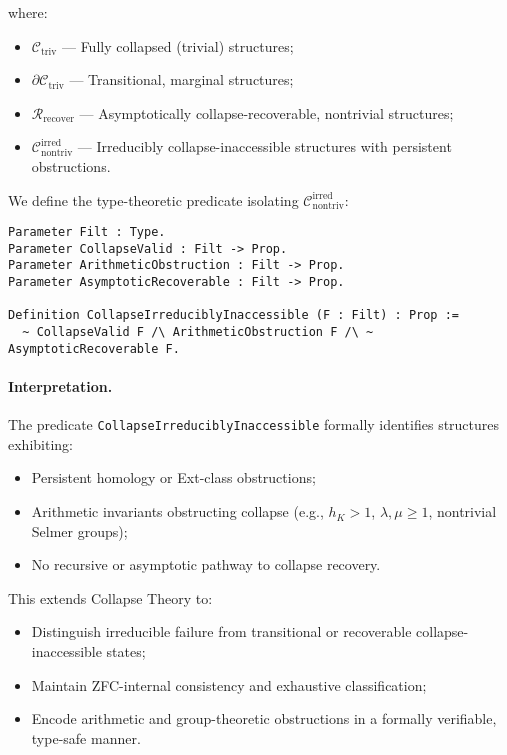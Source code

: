 \documentclass[11pt]{article}
\begin{document}
where:

\begin{itemize}
    \item $\mathcal{C}_{\mathrm{triv}}$ — Fully collapsed (trivial) structures;
    \item $\partial \mathcal{C}_{\mathrm{triv}}$ — Transitional, marginal structures;
    \item $\mathcal{R}_{\mathrm{recover}}$ — Asymptotically collapse-recoverable, nontrivial structures;
    \item $\mathcal{C}_{\mathrm{nontriv}}^{\mathrm{irred}}$ — Irreducibly collapse-inaccessible structures with persistent obstructions.
\end{itemize}

We define the type-theoretic predicate isolating $\mathcal{C}_{\mathrm{nontriv}}^{\mathrm{irred}}$:

\begin{lstlisting}[language=Coq]
Parameter Filt : Type.
Parameter CollapseValid : Filt -> Prop.
Parameter ArithmeticObstruction : Filt -> Prop.
Parameter AsymptoticRecoverable : Filt -> Prop.

Definition CollapseIrreduciblyInaccessible (F : Filt) : Prop :=
  ~ CollapseValid F /\ ArithmeticObstruction F /\ ~ AsymptoticRecoverable F.
\end{lstlisting}

\paragraph{Interpretation.}

The predicate \texttt{CollapseIrreduciblyInaccessible} formally identifies structures exhibiting:

\begin{itemize}
    \item Persistent homology or Ext-class obstructions;
    \item Arithmetic invariants obstructing collapse (e.g., $h_K > 1$, $\lambda, \mu \geq 1$, nontrivial Selmer groups);
    \item No recursive or asymptotic pathway to collapse recovery.
\end{itemize}

This extends Collapse Theory to:

\begin{itemize}
    \item Distinguish irreducible failure from transitional or recoverable collapse-inaccessible states;
    \item Maintain ZFC-internal consistency and exhaustive classification;
    \item Encode arithmetic and group-theoretic obstructions in a formally verifiable, type-safe manner.
\end{itemize}
\end{document}
